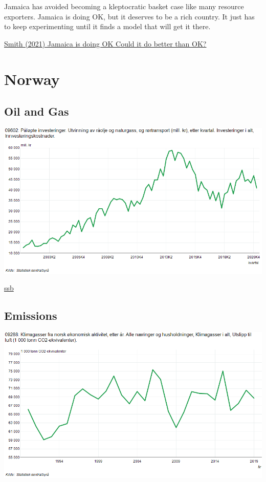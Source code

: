 \documentclass[
]{book}
\begin{document}
Jamaica has avoided becoming a kleptocratic basket case like many resource exporters.
Jamaica is doing OK, but it deserves to be a rich country. It just has to keep experimenting until it finds a model that will get it there.

\href{https://noahpinion.substack.com/p/jamaica-is-doing-ok}{Smith (2021) Jamaica is doing OK Could it do better than OK?}

\hypertarget{norway}{%
\section{Norway}\label{norway}}

\hypertarget{oil-and-gas}{%
\subsection{Oil and Gas}\label{oil-and-gas}}

\includegraphics{fig/ssb_oljegassinvesteringer_norge.png}

\href{https://www.ssb.no/statbank/table/09602/chartViewLine/}{ssb}

\hypertarget{emissions}{%
\subsection{Emissions}\label{emissions}}

\includegraphics{fig/ssb_klimagassutslipp_norge.png}
\end{document}
